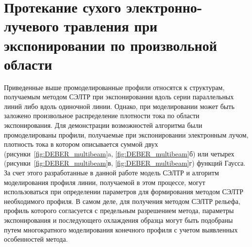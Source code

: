 \section{Протекание сухого электронно-лучевого травления при экспонировании по произвольной области}

Приведенные выше промоделированные профили относятся к структурам, получаемым методом СЭЛТР при экспонировании вдоль серии параллельных линий либо вдоль одиночной линии.
Однако, при моделировании может быть заложено произвольное распределение плотности тока по области экспонирования.
Для демонстрации возможностей алгоритма были промоделированы профили, получаемые при экспонировании электронным лучом, плотность тока в котором описывается суммой двух (рисунки~\ref{fig:DEBER_multibeam}a, \ref{fig:DEBER_multibeam}б) или четырех (рисунки~\ref{fig:DEBER_multibeam}в, \ref{fig:DEBER_multibeam}г) функций Гаусса.
За счет этого разработанные в данной работе модель СЭЛТР и алгоритм моделирования профиля линии, получаемой в этом процессе, могут использоваться при определении параметров для формирования методом СЭЛТР необходимого профиля.
В самом деле, для получения методом СЭЛТР рельефа, профиль которого согласуется с предельным разрешением метода, параметры экспонирования и последующего охлаждения образца могут быть подобраны путем многократного моделирования конечного профиля с учетом выявленных особенностей метода.

